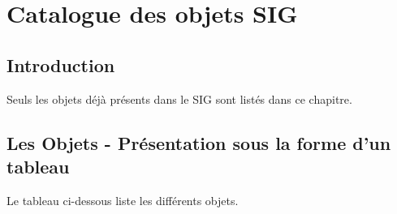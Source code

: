 \documentclass[12pt,titlepage,oneside]{book}
\begin{document}
\chapter{Catalogue des objets SIG}

\section{Introduction}
Seuls les objets déjà présents dans le SIG sont listés dans ce chapitre.


\section{Les Objets - Présentation sous la forme d'un tableau}
Le tableau ci-dessous liste les différents objets.
\vspace{\baselineskip}
\end{document}
